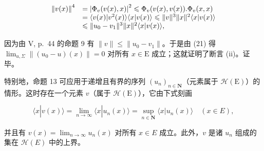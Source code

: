 \[
\begin{array}{r l} \left\| v (x) \right\| ^ {4} & = \left| \Phi_ {v} (v (x), x) \right| ^ {2} \leqslant \Phi_ {v} (v (x), v (x)). \Phi_ {v} (x, x) \\ & = \langle v (x) | v ^ {2} (x) \rangle \langle x | v (x) \rangle \leqslant \| v \| ^ {3} \| x \| ^ {2} \langle x | v (x) \rangle \\ & \leqslant \| u _ {0} - v _ {1} \| ^ {3} \| x \| ^ {2} \langle x | v (x) \rangle , \end{array}
\]

因为由 V, p.~44 的命题 9 有 \(\| v\| \leqslant \| u_0 - v_1\|\)。于是由 (21) 得 \(\lim_{u,\Sigma}\left\| (u_0 - u)(x)\right\| = 0\) 对所有 \(x\in \mathrm{E}\) 成立；这就证明了断言 (ii)。证毕。

特别地，命题 13 可应用于递增且有界的序列 \((u_n)_{n\in \mathbf{N}}\)（元素属于 \(\mathcal{H}(\mathrm{E})\)）的情形。这时存在一个元素 \(v\)（属于 \(\mathcal{H}(\mathrm{E})\)），它由下式刻画

\[
\langle x | v (x) \rangle = \lim _ {n \rightarrow \infty} \langle x | u _ {n} (x) \rangle = \sup _ {n \in \mathbf {N}} \langle x | u _ {n} (x) \rangle \quad (x \in E),
\]

并且有 \(v(x) = \lim_{n\to \infty}u_n(x)\) 对所有 \(x\in E\) 成立。此外，\(v\) 是诸 \(u_{n}\) 组成的集在 \(\mathcal{H}(E)\) 中的上界。

